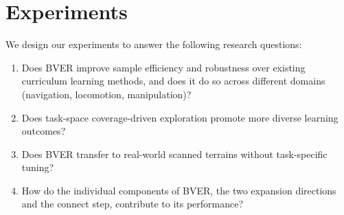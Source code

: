 \section{Experiments}\label{sec:experiments}
We design our experiments to answer the following research questions:
\begin{enumerate}[leftmargin=16pt, itemsep=0.01em, topsep=0.0em]
    \item Does BVER improve sample efficiency and robustness over existing curriculum learning methods, and does it do so across different domains (navigation, locomotion, manipulation)?
    \item Does task-space coverage-driven exploration promote more diverse learning outcomes?
    \item Does BVER transfer to real-world scanned terrains without task-specific tuning?
    \item How do the individual components of BVER, the two expansion directions and the connect step, contribute to its performance?
\end{enumerate}

